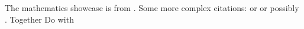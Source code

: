 \documentclass{article}
\begin{document}
The mathematics showcase is from \autocite{Graham1995}.
Some more complex citations: \parencite{Graham1995} or
\textcite{Thomas2008} or possibly .
\autocite[56]{Thomas2008}
\autocite[See][45-48]{Graham1995}
Together \autocite{Thomas2008,Graham1995}
Do with \autocite{posobie}
\printbibliography
\end{document}
